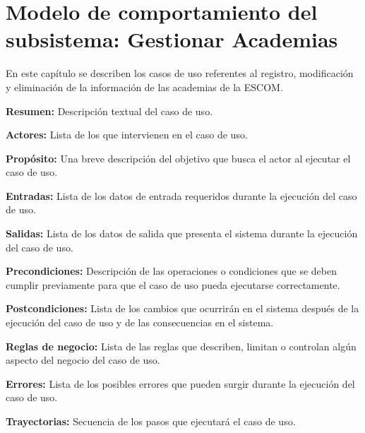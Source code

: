 
\chapter{Modelo de comportamiento del subsistema: Gestionar Academias \label{chp:gestionarAcademias}}
En este capítulo se describen los casos de uso referentes al registro, modificación y eliminación de la información de las academias de la ESCOM. \bigskip

     \begin{objetivos}
	\item {\bf Resumen:} Descripción textual del caso de uso.
	\item {\bf Actores:} Lista de los 
	 que intervienen en el caso de uso.
	\item {\bf Propósito:} Una breve descripción del objetivo que busca el actor al ejecutar el caso de uso.
	\item {\bf Entradas:} Lista de los datos de entrada requeridos durante la ejecución del caso de uso.
	\item {\bf Salidas:} Lista de los datos de salida que presenta el sistema durante la ejecución del caso de uso.
	\item {\bf Precondiciones:} Descripción de las operaciones o condiciones que se deben cumplir previamente para que el caso de uso pueda ejecutarse correctamente.
	\item {\bf Postcondiciones:} Lista de los cambios que ocurrirán en el sistema después de la ejecución del caso de uso y de las consecuencias en el sistema.
	\item {\bf Reglas de negocio:} Lista de las reglas que describen, limitan o controlan algún aspecto del negocio del caso de uso.
	\item {\bf Errores:} Lista de los posibles errores que pueden surgir durante la ejecución del caso de uso.
	\item {\bf Trayectorias:} Secuencia de los pasos que ejecutará el caso de uso.
    \end{objetivos}

	
	
